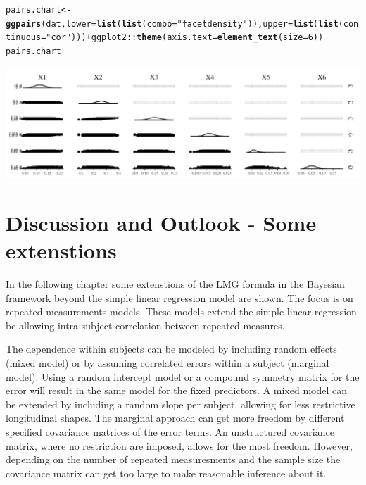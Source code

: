 \documentclass[11pt,a4paper,twoside]{book}\usepackage[]{graphicx}\usepackage[]{color}
\makeatletter
\newcommand{\hlnum}[1]{\textcolor[rgb]{0.686,0.059,0.569}{#1}}%
\newcommand{\hlstr}[1]{\textcolor[rgb]{0.192,0.494,0.8}{#1}}%
\newcommand{\hlopt}[1]{\textcolor[rgb]{0,0,0}{#1}}%
\newcommand{\hlstd}[1]{\textcolor[rgb]{0.345,0.345,0.345}{#1}}%
\newcommand{\hlkwb}[1]{\textcolor[rgb]{0.69,0.353,0.396}{#1}}%
\newcommand{\hlkwc}[1]{\textcolor[rgb]{0.333,0.667,0.333}{#1}}%
\newcommand{\hlkwd}[1]{\textcolor[rgb]{0.737,0.353,0.396}{\textbf{#1}}}%
\newenvironment{kframe}{%
 \def\at@end@of@kframe{}%
 \ifinner\ifhmode%
  \def\at@end@of@kframe{\end{minipage}}%
  \begin{minipage}{\columnwidth}%
 \fi\fi%
 \def\FrameCommand##1{\hskip\@totalleftmargin \hskip-\fboxsep
 \colorbox{shadecolor}{##1}\hskip-\fboxsep
     \hskip-\linewidth \hskip-\@totalleftmargin \hskip\columnwidth}%
 \MakeFramed {\advance\hsize-\width
   \@totalleftmargin\z@ \linewidth\hsize
   \@setminipage}}%
 {\par\unskip\endMakeFramed%
 \at@end@of@kframe}
\newenvironment{knitrout}{}{} %
\makeatother
\begin{document}
\begin{knitrout}
\begin{kframe}
\begin{alltt}
\hlstd{pairs.chart} \hlkwb{<-} \hlkwd{ggpairs}\hlstd{(dat,} \hlkwc{lower} \hlstd{=} \hlkwd{list}\hlstd{(}\hlkwd{list}\hlstd{(}\hlkwc{combo} \hlstd{=} \hlstr{"facetdensity"}\hlstd{)),} \hlkwc{upper} \hlstd{=} \hlkwd{list}\hlstd{(}\hlkwd{list}\hlstd{(}\hlkwc{continuous} \hlstd{=} \hlstr{"cor"}\hlstd{)))} \hlopt{+} \hlstd{ggplot2}\hlopt{::}\hlkwd{theme}\hlstd{(}\hlkwc{axis.text} \hlstd{=} \hlkwd{element_text}\hlstd{(}\hlkwc{size} \hlstd{=} \hlnum{6}\hlstd{))}
\hlstd{pairs.chart}
\end{alltt}
\end{kframe}

{\centering \includegraphics[width=\textwidth-3cm]{figure/ch03_figreal_data_LMG-2} 

}



\end{knitrout}











\chapter{Discussion and Outlook - Some extenstions}

In the following chapter some extenstions of the LMG formula in the Bayesian framework beyond the simple linear regression model are shown. The focus is on repeated measurements models. These models extend the simple linear regression be allowing intra subject correlation between repeated measures. 

The dependence within subjects can be modeled by including random effects (mixed model) or by assuming correlated errors within a subject (marginal model). Using a random intercept model or a compound symmetry matrix for the error will result in the same model for the fixed predictors. A mixed model can be extended by including a random slope per subject, allowing for less restrictive longitudinal shapes. The marginal approach can get more freedom by different specified covariance matrices of the error terms. An unstructured covariance matrix, where no restriction are imposed, allows for the most freedom. However, depending on the number of repeated measuresments and the sample size the covariance matrix can get too large to make reasonable inference about it. 
\end{document}
